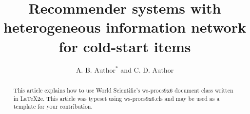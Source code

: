 \documentclass{ws-procs9x6}            %
\begin{document}
\title{Recommender systems with heterogeneous information network for cold-start items}

\author{A. B. Author$^*$ and C. D. Author}

\address{University Department, University Name,\\
City, State ZIP/Zone, Country\\
$^*$E-mail: ab\_author@university.com\\
www.university\_name.edu}

\begin{abstract}
This article explains how to use World Scientific's ws-procs9x6
document class written in \LaTeX2e. This article was typeset using
ws-procs9x6.cls and may be used as a template for your contribution.
\end{abstract}


\bodymatter
















\end{document}
